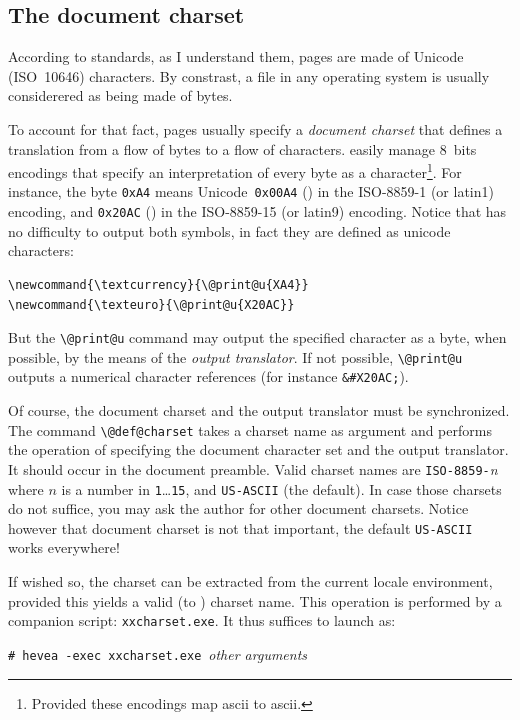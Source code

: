 \subsection{The \label{encodings}document charset}
According to standards, as I understand them, \html{} pages are
made of Unicode (ISO~10646) characters.
By constrast, a file in any operating system is usually considerered as
being made of bytes.

%
To account for that fact, \html{} pages usually specify a \emph{document
charset} that defines a translation from a flow of bytes to a flow of
characters. \hevea{} easily manage 8~bits encodings that specify an
interpretation of every byte as a character\footnote{Provided these
encodings map ascii to ascii.}.
For instance, the byte
\texttt{0xA4} means Unicode~\texttt{0x00A4} (\textcurrency) in the
ISO-8859-1 (or latin1) encoding, and \texttt{0x20AC} (\texteuro) in
the ISO-8859-15 (or latin9) encoding.
Notice that \hevea{} has no difficulty to output both symbols, in fact
they are defined as unicode characters:
\begin{verbatim}
\newcommand{\textcurrency}{\@print@u{XA4}}
\newcommand{\texteuro}{\@print@u{X20AC}}
\end{verbatim}
But the \verb+\@print@u+ command may output the specified character as
a byte, when possible, by the means of the \emph{output translator}.
If not possible, \verb+\@print@u+ outputs a numerical character
references (for instance \verb+&#X20AC;+).

%
Of course, the document charset and the output translator
must be synchronized. The command \verb+\@def@charset+ takes a
charset name as argument and performs the operation of specifying the
document character set and the output translator. It should occur in
the document preamble.
Valid  charset names are \texttt{ISO-8859-}\textit{n} where $n$ is a
number in \texttt{1}\ldots\texttt{15}, and \texttt{US-ASCII} (the
default).
In case those charsets do not suffice, you may ask the author for
other document charsets.  Notice however that document charset is not
that important, the default \texttt{US-ASCII} works everywhere!


%
If wished so, the charset can be extracted from the current
locale environment, provided this yields a valid (to \hevea) charset name.
This operation is performed by a companion script: \texttt{xxcharset.exe}.
It thus suffices to launch \hevea{} as:
\begin{flushleft}
\texttt{\# hevea -exec xxcharset.exe}~\textit{other arguments} 
\end{flushleft}

